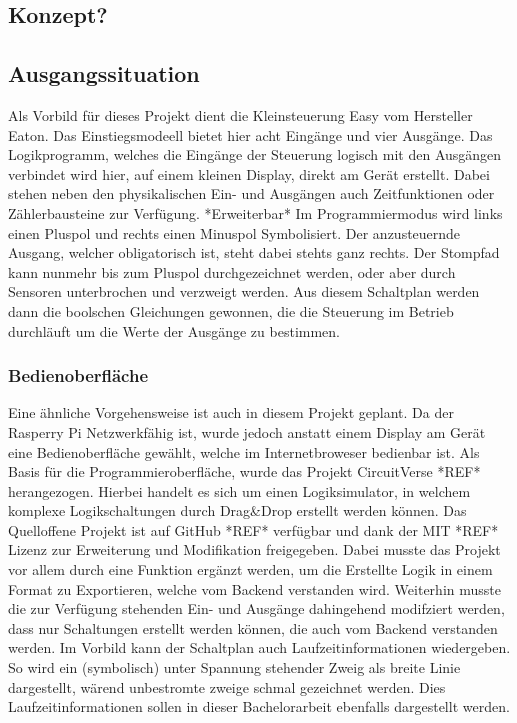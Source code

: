 \subsection{Konzept?}
\subsection{Ausgangssituation} 

Als Vorbild für dieses Projekt dient die Kleinsteuerung Easy vom Hersteller Eaton. Das Einstiegsmodeell bietet hier acht Eingänge und vier Ausgänge. Das Logikprogramm, welches die Eingänge der Steuerung logisch mit den Ausgängen verbindet wird hier, auf einem kleinen Display, direkt am Gerät erstellt. Dabei stehen neben den physikalischen Ein- und Ausgängen auch Zeitfunktionen oder Zählerbausteine zur Verfügung. *Erweiterbar* Im Programmiermodus wird links einen Pluspol und rechts einen Minuspol Symbolisiert. Der anzusteuernde Ausgang, welcher obligatorisch ist, steht dabei stehts ganz rechts. Der Stompfad kann nunmehr bis zum Pluspol durchgezeichnet werden, oder aber durch Sensoren unterbrochen und verzweigt werden. Aus diesem Schaltplan werden dann die boolschen Gleichungen gewonnen, die die Steuerung im Betrieb durchläuft um die Werte der Ausgänge zu bestimmen.
\subsubsection{Bedienoberfläche} 
Eine ähnliche Vorgehensweise ist auch in diesem Projekt geplant. Da der Rasperry Pi Netzwerkfähig ist, wurde jedoch anstatt einem Display am Gerät eine Bedienoberfläche gewählt, welche im Internetbroweser bedienbar ist. Als Basis für die Programmieroberfläche, wurde das Projekt CircuitVerse *REF* herangezogen. Hierbei handelt es sich um einen Logiksimulator, in welchem komplexe Logikschaltungen durch Drag\&Drop erstellt werden können. Das Quelloffene Projekt ist auf GitHub *REF* verfügbar und dank  der MIT *REF* Lizenz zur Erweiterung und Modifikation freigegeben. Dabei musste das Projekt vor allem durch eine Funktion ergänzt werden, um die Erstellte Logik in einem Format zu Exportieren, welche vom Backend verstanden wird. Weiterhin musste die zur Verfügung stehenden Ein- und Ausgänge dahingehend modifziert werden, dass nur Schaltungen erstellt werden können, die auch vom Backend verstanden werden. 
Im Vorbild kann der Schaltplan auch Laufzeitinformationen wiedergeben. So wird ein (symbolisch) unter Spannung stehender Zweig als breite Linie dargestellt, wärend unbestromte zweige schmal gezeichnet werden. Dies Laufzeitinformationen sollen in dieser Bachelorarbeit ebenfalls dargestellt werden.
